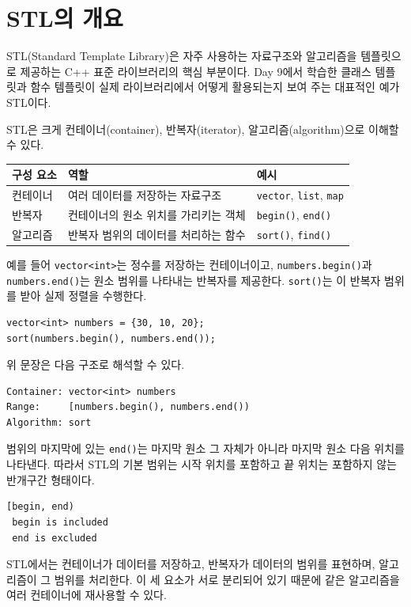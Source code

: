 \documentclass[11pt,a4paper]{article}
\begin{document}
\section{STL의 개요}
STL(Standard Template Library)은 자주 사용하는 자료구조와 알고리즘을 템플릿으로 제공하는 C++ 표준 라이브러리의 핵심 부분이다. Day 9에서 학습한 클래스 템플릿과 함수 템플릿이 실제 라이브러리에서 어떻게 활용되는지 보여 주는 대표적인 예가 STL이다.

STL은 크게 컨테이너(container), 반복자(iterator), 알고리즘(algorithm)으로 이해할 수 있다.

\begin{center}
\begin{tabular}{lll}
\toprule
구성 요소 & 역할 & 예시 \\
\midrule
컨테이너 & 여러 데이터를 저장하는 자료구조 & \texttt{vector}, \texttt{list}, \texttt{map} \\
반복자 & 컨테이너의 원소 위치를 가리키는 객체 & \texttt{begin()}, \texttt{end()} \\
알고리즘 & 반복자 범위의 데이터를 처리하는 함수 & \texttt{sort()}, \texttt{find()} \\
\bottomrule
\end{tabular}
\end{center}

예를 들어 \texttt{vector<int>}는 정수를 저장하는 컨테이너이고, \texttt{numbers.begin()}과 \texttt{numbers.end()}는 원소 범위를 나타내는 반복자를 제공한다. \texttt{sort()}는 이 반복자 범위를 받아 실제 정렬을 수행한다.

\begin{lstlisting}
vector<int> numbers = {30, 10, 20};
sort(numbers.begin(), numbers.end());
\end{lstlisting}

위 문장은 다음 구조로 해석할 수 있다.

\begin{verbatim}
Container: vector<int> numbers
Range:     [numbers.begin(), numbers.end())
Algorithm: sort
\end{verbatim}

범위의 마지막에 있는 \texttt{end()}는 마지막 원소 그 자체가 아니라 마지막 원소 다음 위치를 나타낸다. 따라서 STL의 기본 범위는 시작 위치를 포함하고 끝 위치는 포함하지 않는 반개구간 형태이다.

\begin{verbatim}
[begin, end)
 begin is included
 end is excluded
\end{verbatim}

\begin{importantbox}
STL에서는 컨테이너가 데이터를 저장하고, 반복자가 데이터의 범위를 표현하며, 알고리즘이 그 범위를 처리한다. 이 세 요소가 서로 분리되어 있기 때문에 같은 알고리즘을 여러 컨테이너에 재사용할 수 있다.
\end{importantbox}
\end{document}
